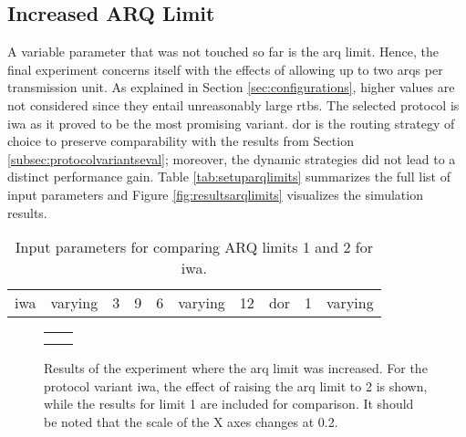 \subsection{Increased ARQ Limit}
A variable parameter that was not touched so far is the \gls{arq} limit. Hence, the final experiment concerns itself with the effects of allowing up
to two \glspl{arq} per transmission unit. As explained in Section \ref{sec:configurations}, higher values are not considered since they entail
unreasonably large \glspl{rtb}. The selected protocol is \gls{iwa} as it proved to be the most promising variant. \Gls{dor} is the routing strategy of
choice to preserve comparability with the results from Section \ref{subsec:protocolvariantseval}; moreover, the dynamic strategies did not lead to a
distinct performance gain. Table \vref{tab:setuparqlimits} summarizes the full list of input parameters and Figure \vref{fig:resultsarqlimits}
visualizes the simulation results.

\begin{table}
    \centering
    \begin{tabulary}{\textwidth}{C|C|C|C|C|C|C|C|C|C}
        \pProtVar{} & \pNCMode{} & \pEncMods{} & \pAuthMods{} & \pRQSize{} & \pARQLimit{} & \pARQTimeout{} & \pRStrat{} & \pAttackerSet{} & \pAttackProb{} \\\hline
        \gls{iwa} & varying & 3 & 9 & 6 & varying & 12 & \gls{dor} & 1 & varying \\
    \end{tabulary}
    \caption[Input parameters for the ARQ limit comparisons]{Input parameters for comparing ARQ limits 1 and 2 for \gls{iwa}.}
    \label{tab:setuparqlimits}
\end{table}

\begin{figure}
    \centering
    \begin{tabular}{cc}
         &  \\
         & 
    \end{tabular}
    \caption[Results for the ARQ limit comparisons]{Results of the experiment where the \gls{arq} limit was increased. For the protocol
    variant \gls{iwa}, the effect of raising the \gls{arq} limit to 2 is shown, while the results for limit 1 are included for comparison. It should
    be noted that the scale of the X axes changes at 0.2.}
    \label{fig:resultsarqlimits}
\end{figure}

